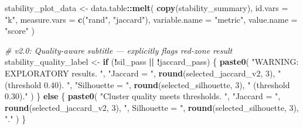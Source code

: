 \documentclass[
]{article}
\newenvironment{Shaded}{\begin{snugshade}}{\end{snugshade}}
\newcommand{\AttributeTok}[1]{\textcolor[rgb]{0.13,0.29,0.53}{#1}}
\newcommand{\CommentTok}[1]{\textcolor[rgb]{0.56,0.35,0.01}{\textit{#1}}}
\newcommand{\ControlFlowTok}[1]{\textcolor[rgb]{0.13,0.29,0.53}{\textbf{#1}}}
\newcommand{\DecValTok}[1]{\textcolor[rgb]{0.00,0.00,0.81}{#1}}
\newcommand{\FunctionTok}[1]{\textcolor[rgb]{0.13,0.29,0.53}{\textbf{#1}}}
\newcommand{\NormalTok}[1]{#1}
\newcommand{\OtherTok}[1]{\textcolor[rgb]{0.56,0.35,0.01}{#1}}
\newcommand{\SpecialCharTok}[1]{\textcolor[rgb]{0.81,0.36,0.00}{\textbf{#1}}}
\newcommand{\StringTok}[1]{\textcolor[rgb]{0.31,0.60,0.02}{#1}}
\begin{document}
\begin{Shaded}
\begin{Highlighting}[]
\NormalTok{stability\_plot\_data }\OtherTok{\textless{}{-}}\NormalTok{ data.table}\SpecialCharTok{::}\FunctionTok{melt}\NormalTok{(}
  \FunctionTok{copy}\NormalTok{(stability\_summary),}
  \AttributeTok{id.vars =} \StringTok{"k"}\NormalTok{,}
  \AttributeTok{measure.vars =} \FunctionTok{c}\NormalTok{(}\StringTok{"rand"}\NormalTok{, }\StringTok{"jaccard"}\NormalTok{),}
  \AttributeTok{variable.name =} \StringTok{"metric"}\NormalTok{,}
  \AttributeTok{value.name =} \StringTok{"score"}
\NormalTok{)}

\CommentTok{\# v2.0: Quality{-}aware subtitle — explicitly flags red{-}zone result}
\NormalTok{stability\_quality\_label }\OtherTok{\textless{}{-}} \ControlFlowTok{if}\NormalTok{ (}\SpecialCharTok{!}\NormalTok{sil\_pass }\SpecialCharTok{||} \SpecialCharTok{!}\NormalTok{jaccard\_pass) \{}
  \FunctionTok{paste0}\NormalTok{(}
    \StringTok{"WARNING: EXPLORATORY results. "}\NormalTok{,}
    \StringTok{"Jaccard = "}\NormalTok{, }\FunctionTok{round}\NormalTok{(selected\_jaccard\_v2, }\DecValTok{3}\NormalTok{),}
    \StringTok{" (threshold 0.40). "}\NormalTok{,}
    \StringTok{"Silhouette = "}\NormalTok{, }\FunctionTok{round}\NormalTok{(selected\_silhouette, }\DecValTok{3}\NormalTok{),}
    \StringTok{" (threshold 0.30)."}
\NormalTok{  )}
\NormalTok{\} }\ControlFlowTok{else}\NormalTok{ \{}
  \FunctionTok{paste0}\NormalTok{(}
    \StringTok{"Cluster quality meets thresholds. "}\NormalTok{,}
    \StringTok{"Jaccard = "}\NormalTok{, }\FunctionTok{round}\NormalTok{(selected\_jaccard\_v2, }\DecValTok{3}\NormalTok{),}
    \StringTok{", Silhouette = "}\NormalTok{, }\FunctionTok{round}\NormalTok{(selected\_silhouette, }\DecValTok{3}\NormalTok{), }\StringTok{"."}
\NormalTok{  )}
\NormalTok{\}}


\end{Highlighting}
\end{Shaded}
\end{document}
